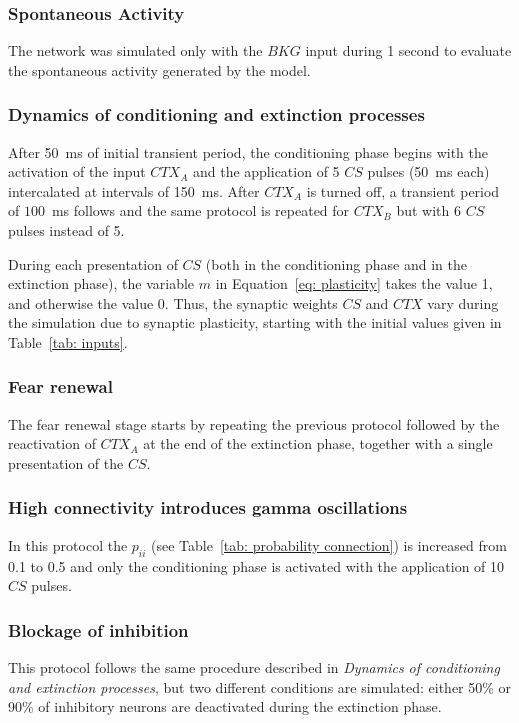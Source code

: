 \subsubsection*{Spontaneous Activity}
The network was simulated only with the $BKG$ input during 1 second to evaluate the spontaneous activity generated by the model.

\subsubsection*{Dynamics of conditioning and extinction processes}
After 50~ms of initial transient period, the conditioning phase begins with the activation of the input $CTX_A$ and the application of 5 $CS$ pulses (50~ms each) intercalated at intervals of 150~ms. After $CTX_A$ is turned off, a transient period of $100$~ms follows and the same protocol is repeated for $CTX_B$ but with 6 $CS$ pulses instead of 5.

During each presentation of $CS$ (both in the conditioning phase and in the extinction phase), the variable $m$ in Equation~\ref{eq: plasticity} takes the value 1, and otherwise the value 0. Thus, the synaptic weights $CS$ and $CTX$ vary during the simulation due to synaptic plasticity, starting with the initial values given in Table~\ref{tab: inputs}.

\subsubsection*{Fear renewal} The fear renewal stage starts by repeating the previous protocol followed by the reactivation of $CTX_A$ at the end of the extinction phase, together with a single presentation of the $CS$. 

\subsubsection*{High connectivity introduces gamma oscillations}
In this protocol the $p_{ii}$ (see Table~\ref{tab: probability connection}) is increased from 0.1 to 0.5 and only the conditioning phase is activated with the application of 10 $CS$ pulses.

\subsubsection*{Blockage of inhibition}
This protocol follows the same procedure described in \textit{Dynamics of conditioning and extinction processes}, but two different conditions are simulated: either 50\% or 90\% of inhibitory neurons are deactivated during the extinction phase.

